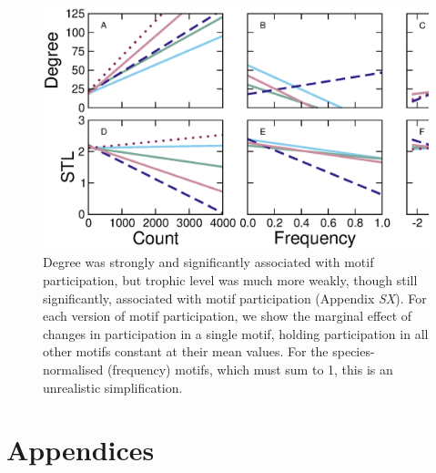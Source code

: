 \documentclass[12pt]{article}
\begin{document}
    \begin{figure}[h!]
        \centering
        \includegraphics{figures/motifs_vs_degTL.eps}
        \caption{Degree was strongly and significantly associated with motif participation, but trophic level was much more weakly, though still significantly, associated with motif participation (Appendix \emph{SX}). For each version of motif participation, we show the marginal effect of changes in participation in a single motif, holding participation in all other motifs constant at their mean values. For the species-normalised (frequency) motifs, which must sum to 1, this is an unrealistic simplification. }
        \label{fig:motifs_degTL}
    \end{figure}


\clearpage

\section*{Appendices}
\end{document}
